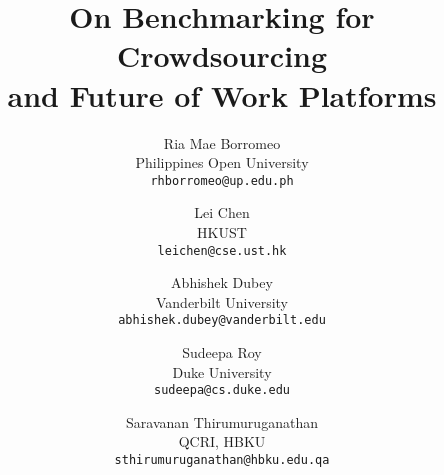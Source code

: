 \documentclass[11pt]{article}
\begin{document}
\title{On Benchmarking for Crowdsourcing\\ and Future of Work Platforms}
\author{Ria Mae Borromeo\\
Philippines Open University\\
\texttt{{\footnotesize rhborromeo@up.edu.ph}}
\and
Lei Chen\\
HKUST\\
\texttt{{\footnotesize leichen@cse.ust.hk}}
\and
Abhishek Dubey\\
Vanderbilt University\\
\texttt{{\footnotesize abhishek.dubey@vanderbilt.edu}}
\and
Sudeepa Roy\\
Duke University\\
\texttt{{\footnotesize sudeepa@cs.duke.edu}}
\and
Saravanan Thirumuruganathan\\
QCRI, HBKU\\
\texttt{{\footnotesize sthirumuruganathan@hbku.edu.qa}}
}
\maketitle







%
%









\end{document}
